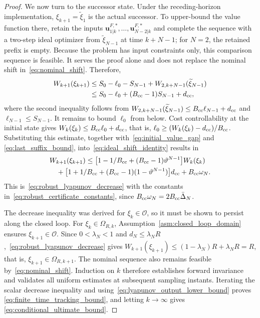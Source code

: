 \documentclass[journal]{IEEEtran}
\newcommand{\vu}{\mathbf{u}}
\theoremstyle{plain}
\theoremstyle{definition}
\theoremstyle{definition}
\begin{document}
\begin{proof}
We now turn to the successor state. Under the receding-horizon
implementation, $\xi_{k+1}=\widetilde\xi_1$ is the actual successor.
To upper-bound the value function there, retain the inputs
$\vu_{1|k}^{F,*},\ldots,\vu_{N-2|k}^{F,*}$ and complete the sequence
with a two-step ideal optimizer from $\widetilde\xi_{N-1}$ at time
$k+N-1$; for $N=2$, the retained prefix is empty. Because the problem
has input constraints only, this comparison sequence is feasible. It
serves the proof alone and does not replace the nominal shift
in~\eqref{eq:nominal_shift}. Therefore,
\begin{equation}
\begin{aligned}
W_{k+1}(\xi_{k+1})
&\le S_0-\ell_0-S_{N-1}+W_{2,k+N-1}(\widetilde\xi_{N-1})\\
&\le S_0-\ell_0+(B_{\rm cc}-1)S_{N-1}+d_{\rm cc},
\end{aligned}
\label{eq:ideal_shift_identity}
\end{equation}
where the second inequality follows from
$W_{2,k+N-1}(\widetilde\xi_{N-1})\le B_{\rm cc}\ell_{N-1}+d_{\rm cc}$ and
$\ell_{N-1}\le S_{N-1}$. It remains to bound $\ell_0$ from below.
Cost controllability at the initial state gives
$W_k(\xi_k)\le B_{\rm cc}\ell_0+d_{\rm cc}$, that is,
$\ell_0\ge(W_k(\xi_k)-d_{\rm cc})/B_{\rm cc}$. Substituting this
estimate, together with~\eqref{eq:initial_value_gap} and
\eqref{eq:last_suffix_bound}, into~\eqref{eq:ideal_shift_identity}
results in
\begin{equation*}
\begin{aligned}
&W_{k+1}(\xi_{k+1})
\le\big[1-1/B_{\rm cc}+(B_{\rm cc}-1)\vartheta^{N-1}\big]W_k(\xi_k)\\
&\quad+\big[1+1/B_{\rm cc}
+(B_{\rm cc}-1)(1-\vartheta^{N-1})\big]d_{\rm cc}+B_{\rm cc}\omega_N.
\end{aligned}
\end{equation*}
This is~\eqref{eq:robust_lyapunov_decrease} with the constants
in~\eqref{eq:robust_certificate_constants}, since
$B_{\rm cc}\omega_N=2B_{\rm cc}\bar\Delta_N$.

The decrease inequality was derived for $\xi_k\in\mathcal O$, so it
must be shown to persist along the closed loop. For
$\xi_k\in\Omega_{R,k}$, Assumption~\ref{asm:closed_loop_domain}
ensures $\xi_{k+1}\in\mathcal O$. Since $0<\lambda_N<1$ and
$d_N\le\lambda_NR$,~\eqref{eq:robust_lyapunov_decrease} gives
$W_{k+1}(\xi_{k+1})\le(1-\lambda_N)R+\lambda_NR=R$, that is,
$\xi_{k+1}\in\Omega_{R,k+1}$. The nominal sequence also remains
feasible by~\eqref{eq:nominal_shift}. Induction on $k$ therefore
establishes forward invariance and validates all uniform estimates at
subsequent sampling instants. Iterating the scalar decrease inequality
and using~\eqref{eq:lyapunov_output_lower_bound} proves
\eqref{eq:finite_time_tracking_bound}, and letting $k\to\infty$ gives
\eqref{eq:conditional_ultimate_bound}.
\end{proof}
\end{document}
